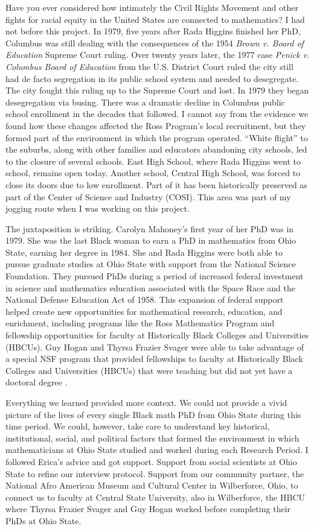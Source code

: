 \documentclass[pdflatex,sn-mathphys-num]{sn-jnl}%
\begin{document}
Have you ever considered how intimately the Civil Rights Movement and other fights for racial equity in the United States are connected to mathematics? I had not before this project. In 1979, five years after Rada Higgins finished her PhD, Columbus was still dealing with the consequences of the 1954 \emph{Brown v. Board of Education} Supreme Court ruling. Over twenty years later, the 1977 case \emph{Penick v. Columbus Board of Education} from the U.S. District Court ruled the city still had de facto segregation in its public school system and needed to desegregate. The city fought this ruling up to the Supreme Court and lost. In 1979 they began desegregation via busing. There was a dramatic decline in Columbus public school enrollment in the decades that followed. I cannot say from the evidence we found how these changes affected the Ross Program's local recruitment, but they formed part of the environment in which the program operated. ``White flight'' to the suburbs, along with other families and educators abandoning city schools, led to the closure of several schools. East High School, where Rada Higgins went to school, remains open today. Another school, Central High School, was forced to close its doors due to low enrollment. Part of it has been historically preserved as part of the Center of Science and Industry (COSI). This area was part of my jogging route when I was working on this project. 

The juxtaposition is striking. Carolyn Mahoney's first year of her PhD was in 1979. She was the last Black woman to earn a PhD in mathematics from Ohio State, earning her degree in 1984. She and Rada Higgins were both able to pursue graduate studies at Ohio State with support from the National Science Foundation. They pursued PhDs during a period of increased federal investment in science and mathematics education associated with the Space Race and the National Defense Education Act of 1958. This expansion of federal support helped create new opportunities for mathematical research, education, and enrichment, including programs like the Ross Mathematics Program and fellowship opportunities for faculty at Historically Black Colleges and Universities (HBCUs). Guy Hogan and Thyrsa Frazier Svager were able to take advantage of a special NSF program that provided fellowships to faculty at Historically Black Colleges and Universities (HBCUs) that were teaching but did not yet have a doctoral degree \cite{clark2025hiddenfigures}.  

Everything we learned provided more context. We could not provide a vivid picture of the lives of every single Black math PhD from Ohio State during this time period. We could, however, take care to understand key historical, institutional, social, and political factors that formed the environment in which mathematicians at Ohio State studied and worked during each Research Period. I followed Erica's advice and got support. Support from social scientists at Ohio State to refine our interview protocol. Support from our community partner, the National Afro American Museum and Cultural Center in Wilberforce, Ohio, to connect us to faculty at Central State University, also in Wilberforce, the HBCU where Thyrsa Frazier Svager and Guy Hogan worked before completing their PhDs at Ohio State. 
\end{document}
